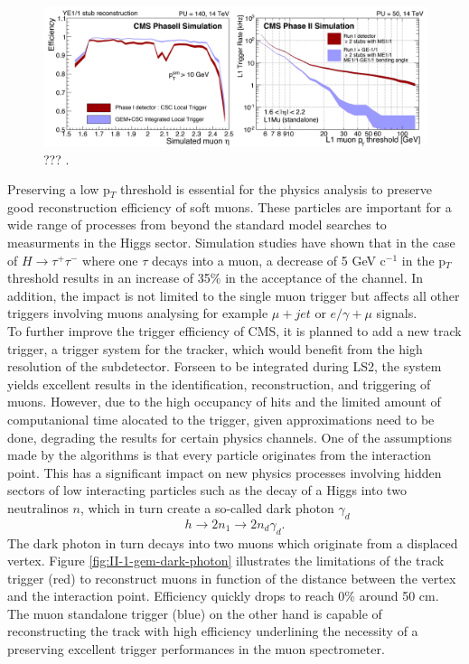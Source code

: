     \begin{figure}[h!]
      \centering
      \includegraphics[width=\textwidth]{img/II-1-gem/gem-csc-efficiency.pdf}
      \caption{??? \cite{Colaleo:2021453}.}
      \label{fig:II-1-gem-trigger}
    \end{figure}

    Preserving a low p$_T$ threshold is essential for the physics analysis to preserve good reconstruction efficiency of soft muons. These particles are important for a wide range of processes from beyond the standard model searches to measurments in the Higgs sector. Simulation studies have shown that in the case of $ H \rightarrow \tau^+ \tau^- $ where one $ \tau $ decays into a muon, a decrease of 5 GeV c$^{-1}$ in the p$_T$ threshold results in an increase of 35\% in the acceptance of the channel. In addition, the impact is not limited to the single muon trigger but affects all other triggers involving muons analysing for example $\mu+jet$ or $e/\gamma+\mu$ signals. \\

    To further improve the trigger efficiency of CMS, it is planned to add a new track trigger, a trigger system for the tracker, which would benefit from the high resolution of the subdetector. Forseen to be integrated during LS2, the system yields excellent results in the identification, reconstruction, and triggering of muons. However, due to the high occupancy of hits and the limited amount of computanional time alocated to the trigger, given approximations need to be done, degrading the results for certain physics channels. One of the assumptions made by the algorithms is that every particle originates from the interaction point. This has a significant impact on new physics processes involving hidden sectors of low interacting particles such as the decay of a Higgs into two neutralinos $ n $, which in turn create a so-called dark photon $ \gamma_d $
    \begin{equation}
      h \rightarrow 2 n_1 \rightarrow 2 n_d \gamma_d .
    \end{equation}
    The dark photon in turn decays into two muons which originate from a displaced vertex. Figure \ref{fig:II-1-gem-dark-photon} illustrates the limitations of the track trigger (red) to reconstruct muons in function of the distance between the vertex and the interaction point. Efficiency quickly drops to reach 0\% around 50 cm. The muon standalone trigger (blue) on the other hand is capable of reconstructing the track with high efficiency underlining the necessity of a preserving excellent trigger performances in the muon spectrometer.

